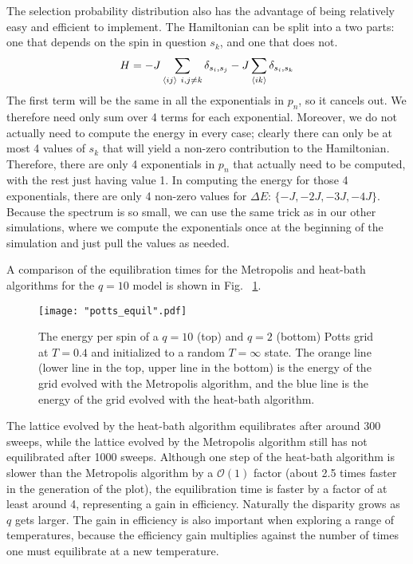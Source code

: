 \documentclass[twocolumn,aps,prl]{revtex4-1} %
\begin{document}
The selection probability distribution also has the advantage of being relatively easy and efficient to implement. The Hamiltonian can be split into a two parts: one that depends on the spin in question $s_k$, and one that does not.
\begin{equation}
	H = -J\sum_{\braket{ij}\ i,j\neq k}\delta_{s_i,s_j} - J\sum_{\braket{ik}}\delta_{s_i,s_k}
\end{equation}
The first term will be the same in all the exponentials in $p_n$, so it cancels out. We therefore need only sum over 4 terms for each exponential. Moreover, we do not actually need to compute the energy in every case; clearly there can only be at most 4 values of $s_k$ that will yield a non-zero contribution to the Hamiltonian. Therefore, there are only 4 exponentials in $p_n$ that actually need to be computed, with the rest just having value 1. In computing the energy for those 4 exponentials, there are only 4 non-zero values for $\Delta E$: $\{-J, -2J, -3J, -4J\}$. Because the spectrum is so small, we can use the same trick as in our other simulations, where we compute the exponentials once at the beginning of the simulation and just pull the values as needed.

A comparison of the equilibration times for the Metropolis and heat-bath algorithms for the $q = 10$ model is shown in Fig.~ \ref{fig:pottsequil}.
\begin{figure}
	\texttt{[image: "potts\_equil".pdf]}
	\caption{\label{fig:pottsequil}The energy per spin of a $q = 10$ (top) and $q = 2$ (bottom) Potts grid at $T = 0.4$ and initialized to a random $T = \infty$ state. The orange line (lower line in the top, upper line in the bottom) is the energy of the grid evolved with the Metropolis algorithm, and the blue line is the energy of the grid evolved with the heat-bath algorithm.}
\end{figure}

The lattice evolved by the heat-bath algorithm equilibrates after around 300 sweeps, while the lattice evolved by the Metropolis algorithm still has not equilibrated after 1000 sweeps. Although one step of the heat-bath algorithm is slower than the Metropolis algorithm by a $\mathcal{O}(1)$ factor (about 2.5 times faster in the generation of the plot), the equilibration time is faster by a factor of at least around 4, representing a gain in efficiency. Naturally the disparity grows as $q$ gets larger. The gain in efficiency is also important when exploring a range of temperatures, because the efficiency gain multiplies against the number of times one must equilibrate at a new temperature.
\end{document}
